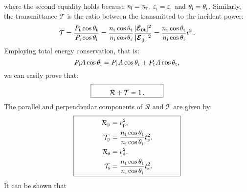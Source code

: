 where the second equality holds because $\textit{n}_{\textrm{i}}= \textit{n}_{\textrm{r}}$, $\varepsilon_{\textrm{i}} = \varepsilon_{\textrm{r}}$ and $\theta_{\textrm{i}} = \theta_{\textrm{r}}$.
Similarly, the transmittance $\mathcal{T}$ is the ratio between the transmitted to the incident power:
\begin{equation}\label{transmittance}
\mathcal{T} = \frac{P_\textrm{t} \cos\theta_\textrm{t}}{P_\textrm{i}\cos\theta_\textrm{i}} = \frac{n_\textrm{t} \cos\theta_\textrm{t}}{n_\textrm{i} \cos\theta_\textrm{i}}\frac{|\boldsymbol{\mathcal{E}}_{0 \textrm{t}}|^2}{\boldsymbol{|\mathcal{E}}_{0 \textrm{i}}|^2} = \frac{n_\textrm{t} \cos\theta_\textrm{t}}{n_\textrm{i} \cos\theta_\textrm{i}} t^2\,.
\end{equation}
Employing total energy conservation, that is:
\begin{equation}
P_\textrm{i} A\cos\theta_\textrm{i} = P_\textrm{r} A\cos\theta_\textrm{r}+P_\textrm{t} A\cos\theta_\textrm{t},
\end{equation}
we can easily prove that:
\begin{equation}
\fbox{\begin{minipage}{10em}
\begin{equation*}
\mathcal{R}+\mathcal{T}=1\,.
\end{equation*}
\end{minipage}}
\end{equation}
 The parallel and perpendicular components of $\mathcal{R}$ and $\mathcal{T}$ are given by:
\begin{equation}
\fbox{\begin{minipage}{15em}
\begin{equation*}\label{Fresnel_pands}
\begin{split}
\mathcal{R}_\textrm{p}& =  {r_\textrm{p}^2},\\
\mathcal{T}_\textrm{p} &=  \frac{n_\textrm{t} \cos\myangle_\textrm{t}}{n_\textrm{i} \cos\myangle_\textrm{i}}t_\textrm{p}^2,\\
\mathcal{R}_\textrm{s} &=  r_\textrm{s}^2,\\
\mathcal{T}_\textrm{s} &= \frac{n_\textrm{t} \cos\myangle_\textrm{t}}{n_\textrm{i} \cos\myangle_\textrm{i}}t_\textrm{s}^2.\\
\end{split}
\end{equation*}
\end{minipage}}
\end{equation}
It can be shown that 
